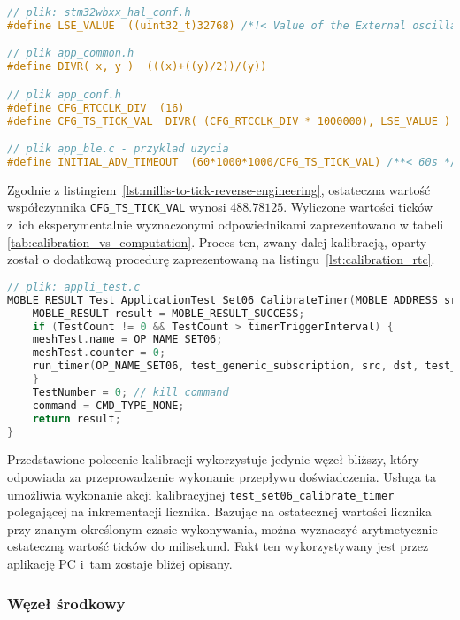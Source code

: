 \begin{lstlisting}[language=C,
    caption={Ścieżka inżynierii wstecznej w celu znalezienia współczynnika umożliwiającego konwersję milisekund do ticków},
    label={lst:millis-to-tick-reverse-engineering}]
// plik: stm32wbxx_hal_conf.h
#define LSE_VALUE  ((uint32_t)32768) /*!< Value of the External oscillator in Hz*/

// plik app_common.h
#define DIVR( x, y )  (((x)+((y)/2))/(y))

// plik app_conf.h
#define CFG_RTCCLK_DIV  (16)
#define CFG_TS_TICK_VAL  DIVR( (CFG_RTCCLK_DIV * 1000000), LSE_VALUE )

// plik app_ble.c - przyklad uzycia
#define INITIAL_ADV_TIMEOUT  (60*1000*1000/CFG_TS_TICK_VAL) /**< 60s */
\end{lstlisting}

Zgodnie z listingiem~\ref{lst:millis-to-tick-reverse-engineering}, ostateczna wartość współczynnika \texttt{CFG\_TS\_TICK\_VAL}
wynosi $488.78125$. Wyliczone wartości ticków z~ich eksperymentalnie wyznaczonymi odpowiednikami zaprezentowano w tabeli
\ref{tab:calibration_vs_computation}. Proces ten, zwany dalej kalibracją, oparty został o dodatkową procedurę zaprezentowaną
na listingu~\ref{lst:calibration_rtc}.

\begin{lstlisting}[language=C,
    caption={Kalibracja mikrokontrolera -- polecenie kalibracyjne},
    label={lst:calibration_rtc}]
// plik: appli_test.c
MOBLE_RESULT Test_ApplicationTest_Set06_CalibrateTimer(MOBLE_ADDRESS src ,MOBLE_ADDRESS dst) {
	MOBLE_RESULT result = MOBLE_RESULT_SUCCESS;
	if (TestCount != 0 && TestCount > timerTriggerInterval) {
	meshTest.name = OP_NAME_SET06;
	meshTest.counter = 0;
	run_timer(OP_NAME_SET06, test_generic_subscription, src, dst, test_set06_calibrate_timer);
	}
	TestNumber = 0; // kill command
	command = CMD_TYPE_NONE;
	return result;
}
\end{lstlisting}

Przedstawione polecenie kalibracji wykorzystuje jedynie węzeł bliższy, który odpowiada za przeprowadzenie
wykonanie przepływu doświadczenia. Usługa ta umożliwia wykonanie akcji kalibracyjnej \texttt{test\_set06\_calibrate\_timer}
polegającej na inkrementacji licznika. Bazując na ostatecznej wartości licznika przy znanym określonym czasie
wykonywania, można wyznaczyć arytmetycznie ostateczną wartość ticków do milisekund. Fakt ten wykorzystywany
jest przez aplikację PC i~tam zostaje bliżej opisany.

\subsubsection{Węzeł środkowy}

